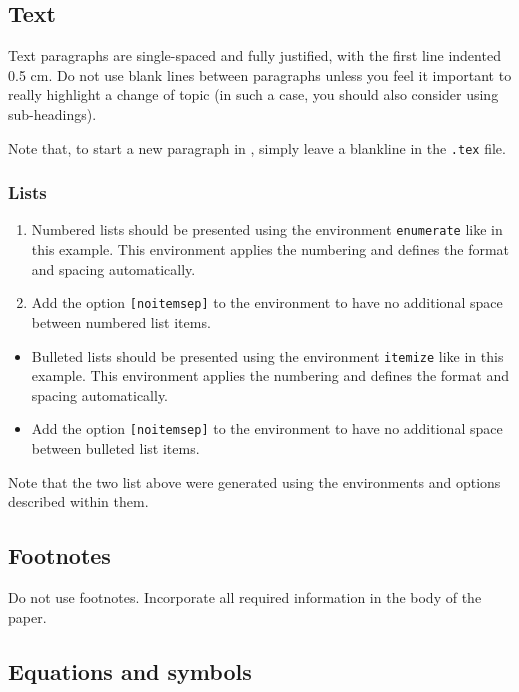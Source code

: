 \documentclass[a4paper, times, 10pt, twocolumn, twoside]{article}
\begin{document}
\subsection{Text}

Text paragraphs are single-spaced and fully justified, with the first line indented 0.5 cm. Do not use blank lines between paragraphs unless you feel it important to really highlight a change of topic (in such a case, you should also consider using sub-headings).

Note that, to start a new paragraph in , simply leave a blankline in the \verb|.tex| file. 

\subsubsection{Lists}

\begin{enumerate}[noitemsep]
\item
Numbered lists should be presented using the environment \verb|enumerate| like in this example. 
This environment applies the numbering and defines the format and spacing automatically. 
\item 
Add the option \verb|[noitemsep]| to the environment to have no additional space between numbered list items.
\end{enumerate}

\begin{itemize}[noitemsep]
\item
Bulleted lists should be presented using the environment \verb|itemize| like in this example. 
This environment applies the numbering and defines the format and spacing automatically. 
\item 
Add the option \verb|[noitemsep]| to the environment to have no additional space between bulleted list items.
\end{itemize}

Note that the two list above were generated using the environments and options described within them.

\subsection{Footnotes}

Do not use footnotes. Incorporate all required information in the body of the paper.

\subsection{Equations and symbols}
\end{document}
